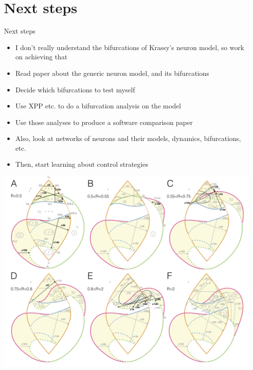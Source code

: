 \documentclass{beamer}
\begin{document}
\section{Next steps}
\label{sec:org25b8aa6}
\begin{frame}[label={sec:org8dcf2c1}]{Next steps}
\begin{itemize}
\item I don't really understand the bifurcations of Krassy's neuron model, so work on achieving that
\item Read paper about the generic neuron model, and its bifurcations
\item Decide which bifurcations to test myself
\item Use XPP etc. to do a bifurcation analysis on the model
\item Use those analyses to produce a software comparison paper
\item Also, look at networks of neurons and their models, dynamics, bifurcations, etc.
\item Then, start learning about control strategies
\end{itemize}



\end{frame}
\begin{frame}[plain]
\begin{center}
\includegraphics[height=1.3\textheight]{hardbif.png}
\end{center}
\end{frame}
\end{document}
